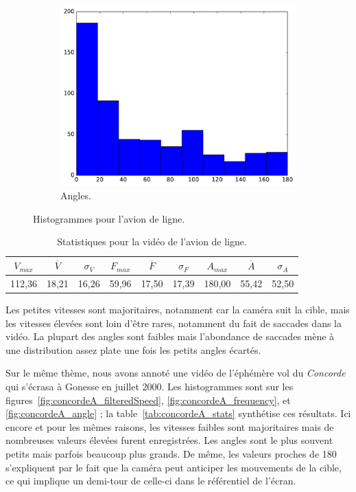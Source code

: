 \begin{figure}[!htbp]
\begin{subfigure}[t]{\subImgWclicks}
			\centering
			\includegraphics[width=\textwidth]{figures/ch3/chinaA_angle}
			\caption{Angles.}
			\label{fig:chinaA_angle}
		\end{subfigure}
		\caption[Histogrammes pour l'avion de ligne]{Histogrammes pour l'avion de ligne.}
		\label{fig:histChina}
	\end{figure}
	
\begin{table}
	\centering
	\begin{tabular}{c c c c c c c c c}
		$V_{max}$	& $\overline{V}$	& $\sigma_{V}$	& $F_{max}$	& $\overline{F}$	& $\sigma_{F}$	& $A_{max}$	& $\overline{A}$	& $\sigma_{A}$	\bigstrut[b] \\ \hline

		112,36		& 18,21				& 16,26			& 59,96		& 17,50				& 17,39			& 180,00	& 55,42				& 52,50			\bigstrut[t] \\
	\end{tabular}
	\caption[Statistiques pour la vidéo de l'avion de ligne]{Statistiques pour la vidéo de l'avion de ligne.}
	\label{tab:chinaA_stats}
\end{table}

	Les petites vitesses sont majoritaires, notamment car la caméra suit la cible, mais les vitesses élevées sont loin d'être rares, notamment du fait de saccades dans la vidéo. La plupart des angles sont faibles mais l'abondance de saccades mène à une distribution assez \og plate \fg{} une fois les petits angles écartés.

	Sur le même thème, nous avons annoté une vidéo de l'éphémère vol du \emph{Concorde} qui s'écrasa à Gonesse en juillet 2000.\footnotemark{} Les histogrammes sont sur les figures~\ref{fig:concordeA_filteredSpeed}, \ref{fig:concordeA_frequency}, et \ref{fig:concordeA_angle} ; la table~\ref{tab:concordeA_stats} synthétise ces résultats. Ici encore et pour les mêmes raisons, les vitesses faibles sont majoritaires mais de nombreuses valeurs élevées furent enregistrées. Les angles sont le plus souvent petits mais parfois beaucoup plus grands. De même, les valeurs proches de 180\textdegree{} s'expliquent par le fait que la caméra peut anticiper les mouvements de la cible, ce qui implique un demi-tour de celle-ci dans le référentiel de l'écran.
	
